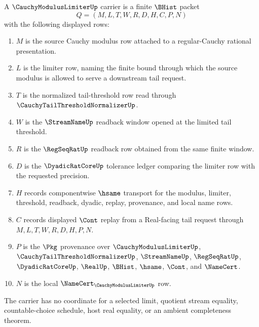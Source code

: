 \begin{definition}
\label{def:cauchy-modulus-limiter-carrier}
A $\CauchyModulusLimiterUp$ carrier is a finite $\BHist$ packet
$$
Q=(M,L,T,W,R,D,H,C,P,N)
$$
with the following displayed rows:
\begin{enumerate}
\item $M$ is the source Cauchy modulus row attached to a regular-Cauchy rational presentation.
\item $L$ is the limiter row, naming the finite bound through which the source modulus is allowed to serve a downstream tail request.
\item $T$ is the normalized tail-threshold row read through $\CauchyTailThresholdNormalizerUp$.
\item $W$ is the $\StreamNameUp$ readback window opened at the limited tail threshold.
\item $R$ is the $\RegSeqRatUp$ readback row obtained from the same finite window.
\item $D$ is the $\DyadicRatCoreUp$ tolerance ledger comparing the limiter row with the requested precision.
\item $H$ records componentwise $\hsame$ transport for the modulus, limiter, threshold, readback, dyadic, replay, provenance, and local name rows.
\item $C$ records displayed $\Cont$ replay from a Real-facing tail request through $M,L,T,W,R,D,H,P,N$.
\item $P$ is the $\Pkg$ provenance over $\CauchyModulusLimiterUp$, $\CauchyTailThresholdNormalizerUp$, $\StreamNameUp$, $\RegSeqRatUp$, $\DyadicRatCoreUp$, $\RealUp$, $\BHist$, $\hsame$, $\Cont$, and $\NameCert$.
\item $N$ is the local $\NameCert_{\CauchyModulusLimiterUp}$ row.
\end{enumerate}
The carrier has no coordinate for a selected limit, quotient stream equality, countable-choice schedule, host real equality, or an ambient completeness theorem.
\end{definition}

